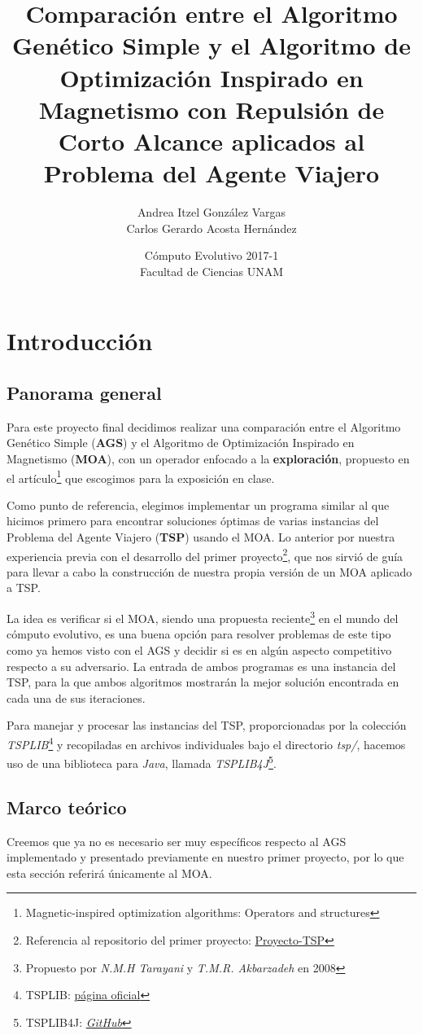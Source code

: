 \documentclass[12pt]{article}
\title{Comparación entre el Algoritmo Genético Simple y el Algoritmo de Optimización Inspirado en Magnetismo con Repulsión de Corto Alcance aplicados al Problema del Agente Viajero}
\author{Andrea Itzel González Vargas \\
  Carlos Gerardo Acosta Hernández}
\date{Cómputo Evolutivo 2017-1 \\ Facultad de Ciencias UNAM \\ }
\begin{document}
\maketitle
\section{Introducción}
\subsection*{Panorama general}
Para este proyecto final decidimos realizar una comparación entre el Algoritmo Genético Simple (\textbf{AGS}) y el Algoritmo de Optimización Inspirado en Magnetismo (\textbf{MOA}),
con un operador enfocado a la \textbf{exploración}, propuesto en el artículo\footnote{Magnetic-inspired optimization algorithms: Operators and structures} que escogimos para la exposición en clase.

Como punto de referencia, elegimos implementar un programa similar al que hicimos primero para encontrar soluciones óptimas de
varias instancias del Problema del Agente Viajero (\textbf{TSP}) usando el MOA. Lo anterior por nuestra experiencia previa con el desarrollo del primer proyecto\footnote{Referencia al repositorio del primer proyecto: \href{https://github.com/Kihui/Proyecto-TSP}{Proyecto-TSP}}, que nos sirvió de guía para llevar a cabo la construcción de nuestra propia versión de un MOA aplicado a TSP.

La idea es verificar si el MOA, siendo una propuesta reciente\footnote{Propuesto por \textit{N.M.H Tarayani} y \textit{T.M.R. Akbarzadeh} en 2008} en el mundo del cómputo evolutivo, es una buena opción para resolver problemas de este tipo como ya hemos visto con el AGS y decidir si es en algún aspecto competitivo respecto a su adversario.
La entrada de ambos programas es una instancia del TSP, para la que ambos algoritmos mostrarán la mejor solución encontrada en cada una de sus iteraciones.

Para manejar y procesar las instancias del TSP, proporcionadas por la colección \textit{TSPLIB}\footnote{TSPLIB: \href{http://comopt.ifi.uni-heidelberg.de/software/TSPLIB95/}{página oficial}} y recopiladas en archivos individuales bajo el directorio \textit{tsp/}, hacemos uso de una
biblioteca para \textit{Java}, llamada \textit{TSPLIB4J}\footnote{TSPLIB4J: \href{https://github.com/dhadka/TSPLIB4J}{\textit{GitHub}}}.


\subsection*{Marco teórico}
Creemos que ya no es necesario ser muy específicos respecto al AGS implementado y presentado previamente en nuestro primer proyecto, por lo que esta
sección referirá únicamente al MOA.\\
\end{document}
